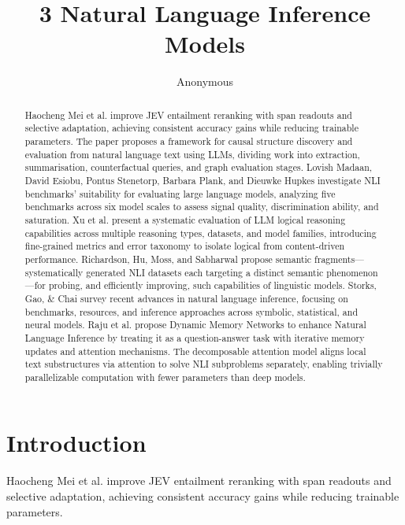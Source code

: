 \documentclass{article}\usepackage{amsmath,amssymb,graphicx,url}
\title{3   Natural Language Inference Models}
\author{Anonymous}
\begin{document}
\maketitle
\begin{abstract}
Haocheng Mei et al. improve JEV entailment reranking with span readouts and selective adaptation, achieving consistent accuracy gains while reducing trainable parameters. \cite{mei2026improving} The paper proposes a framework for causal structure discovery and evaluation from natural language text using LLMs, dividing work into extraction, summarisation, counterfactual queries, and graph evaluation stages. \cite{gendron2024counterfactual} Lovish Madaan, David Esiobu, Pontus Stenetorp, Barbara Plank, and Dieuwke Hupkes investigate NLI benchmarks' suitability for evaluating large language models, analyzing five benchmarks across six model scales to assess signal quality, discrimination ability, and saturation. \cite{madaan2024lost} Xu et al. present a systematic evaluation of LLM logical reasoning capabilities across multiple reasoning types, datasets, and model families, introducing fine-grained metrics and error taxonomy to isolate logical from content-driven performance. \cite{xu2023large} Richardson, Hu, Moss, and Sabharwal propose semantic fragments—systematically generated NLI datasets each targeting a distinct semantic phenomenon—for probing, and efficiently improving, such capabilities of linguistic models. \cite{richardson2020probing} Storks, Gao, \& Chai survey recent advances in natural language inference, focusing on benchmarks, resources, and inference approaches across symbolic, statistical, and neural models. \cite{storks2019recent} Raju et al. propose Dynamic Memory Networks to enhance Natural Language Inference by treating it as a question-answer task with iterative memory updates and attention mechanisms. \cite{raju2017dynamic} The decomposable attention model aligns local text substructures via attention to solve NLI subproblems separately, enabling trivially parallelizable computation with fewer parameters than deep models. \cite{parikh2016decomposable}
\end{abstract}


\keywords{}
\section{Introduction}
Haocheng Mei et al. improve JEV entailment reranking with span readouts and selective adaptation, achieving consistent accuracy gains while reducing trainable parameters. \cite{mei2026improving}
\end{document}
